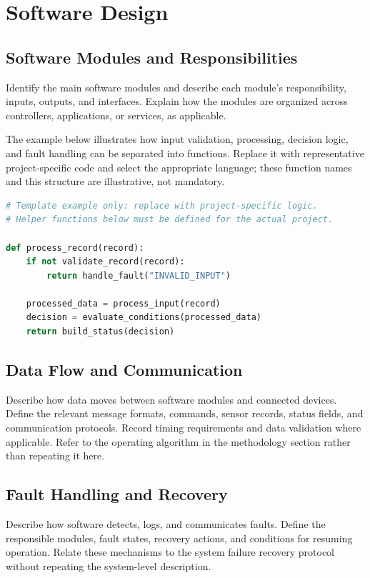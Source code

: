 
\section{Software Design}

\subsection{Software Modules and Responsibilities}

Identify the main software modules and describe each module's responsibility,
inputs, outputs, and interfaces. Explain how the modules are organized across
controllers, applications, or services, as applicable.

The example below illustrates how input validation, processing, decision logic,
and fault handling can be separated into functions. Replace it with
representative project-specific code and select the appropriate language;
these function names and this structure are illustrative, not mandatory.

\begin{lstlisting}[language=Python, caption=Illustrative Software Module Structure]
# Template example only: replace with project-specific logic.
# Helper functions below must be defined for the actual project.

def process_record(record):
    if not validate_record(record):
        return handle_fault("INVALID_INPUT")

    processed_data = process_input(record)
    decision = evaluate_conditions(processed_data)
    return build_status(decision)
\end{lstlisting}

\subsection{Data Flow and Communication}

Describe how data moves between software modules and connected devices.
Define the relevant message formats, commands, sensor records, status fields,
and communication protocols. Record timing requirements and data validation
where applicable. Refer to the operating algorithm in the methodology section
rather than repeating it here.

\subsection{Fault Handling and Recovery}

Describe how software detects, logs, and communicates faults. Define the
responsible modules, fault states, recovery actions, and conditions for
resuming operation. Relate these mechanisms to the system failure recovery
protocol without repeating the system-level description.
